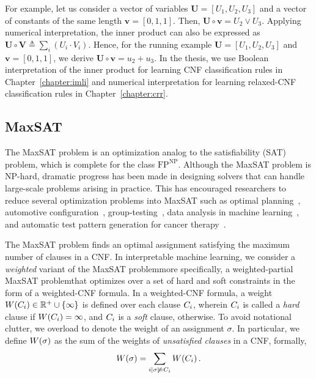 For example, let us consider a vector of variables $ \mathbf{U} = [U_1, U_2, U_3] $ and a vector of constants of the same length $ \mathbf{v} = [0,1,1] $. Then, $ \mathbf{U} \circ \mathbf{v} = U_2 \vee U_3 $. Applying numerical interpretation, the inner product can also be expressed as $\mathbf{U} \circ \mathbf{V} \triangleq \sum_{i} (U_{i} \cdot V_{i}) $. Hence, for the running example $ \mathbf{U} = [U_1, U_2, U_3] $ and $ \mathbf{v} = [0,1,1] $, we derive $ \mathbf{U} \circ \mathbf{v} = u_2  + u_3 $. In the thesis, we use Boolean interpretation of the inner product for learning CNF classification rules in Chapter~\ref{chapter:imli} and numerical interpretation for learning relaxed-CNF classification rules in Chapter~\ref{chapter:crr}.




\subsection{MaxSAT}


The MaxSAT problem is an optimization analog to the satisfiability (SAT) problem, which is complete for the class $ \mathrm{FP}^{\mathrm{NP}} $. Although the MaxSAT problem is NP-hard, dramatic progress has been made in designing solvers that can handle large-scale problems arising in practice. This has encouraged researchers to reduce several optimization problems into MaxSAT such as  optimal planning~\cite{robinson2010partial}, automotive configuration~\cite{walter2013applications}, group-testing~\cite{CGSM2020}, data analysis in machine learning~\cite{berg2019applications}, and automatic test pattern generation for cancer therapy~\cite{lin2012application}. 


The MaxSAT problem finds an optimal assignment satisfying the maximum number of clauses in a CNF. In interpretable machine learning, we consider a \emph{weighted} variant of the MaxSAT problem\textemdash more specifically, a weighted-partial MaxSAT problem\textemdash that optimizes over a set of hard and soft constraints in the form of a weighted-CNF formula. In a weighted-CNF formula, a weight $ {W \! \left( C_i \right)} \in \mathbb{R}^+ \cup \{\infty\} $ is defined over each clause $ C_i $, wherein $C_i$ is called a \emph{hard} clause if $W \! \left( C_i \right) = \infty$, and  $C_i$ is  a \emph{soft} clause, otherwise.  To avoid notational clutter, we overload {\clauseweight{\cdot}} to denote the weight of an assignment $ \sigma $. In particular, we define $W \! \left( \sigma \right)$ as the sum of the weights of \emph{unsatisfied clauses} in a CNF, formally, $$W \! \left( \sigma \right) = \sum_{i | \sigma \not \models C_i} W \! \left( C_i \right).$$


